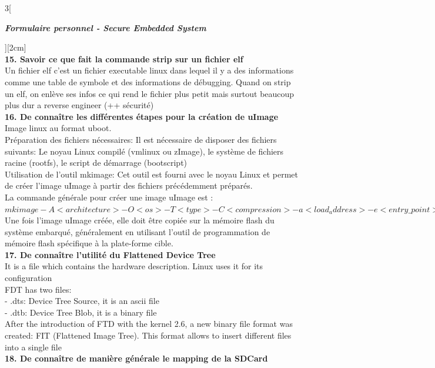 \begin{multicols}{3}[\centerline{ \large\em \textbf{Formulaire personnel - Secure Embedded System}}][2cm]
\\ \textbf{15. Savoir ce que fait la commande strip sur un fichier elf\\}
Un fichier elf c'est un fichier executable linux dans lequel il y a des informations comme une table de symbole et des informations de débugging. Quand on strip un elf, on enlève ses infos ce qui rend le fichier plus petit mais surtout beaucoup plus dur a reverse engineer (++ sécurité)
\\ \textbf{16. De connaître les différentes étapes pour la création de uImage\\}
Image linux au format uboot.\\
Préparation des fichiers nécessaires: Il est nécessaire de disposer des fichiers suivants: Le noyau Linux compilé (vmlinux ou zImage), le système de fichiers racine (rootfs), le script de démarrage (bootscript)\\
Utilisation de l'outil mkimage: Cet outil est fourni avec le noyau Linux et permet de créer l'image uImage à partir des fichiers précédemment préparés. \\
La commande générale pour créer une image uImage est :\\
$mkimage -A <architecture> -O <os> -T <type> -C <compression> -a <load_address> -e <entry\_ point> -n <image\_name> -d <image\_file> <uImage\_file>$\\
Une fois l'image uImage créée, elle doit être copiée sur la mémoire flash du système embarqué, généralement en utilisant l'outil de programmation de mémoire flash spécifique à la plate-forme cible. 
\\ \textbf{17. De connaître l’utilité du Flattened Device Tree\\}
It is a file which contains the hardware description. Linux uses it for its configuration\\
FDT has two files:\\
- .dts: Device Tree Source, it is an ascii file\\
- .dtb: Device Tree Blob, it is a binary file\\
After the introduction of FTD with the kernel 2.6, a new binary file format was created: FIT (Flattened Image Tree).  This format allows to insert different files into a single file
\\ \textbf{18. De connaître de manière générale le mapping de la SDCard\\}
\begin{minipage}{\linewidth}

\end{minipage}
\end{multicols}
